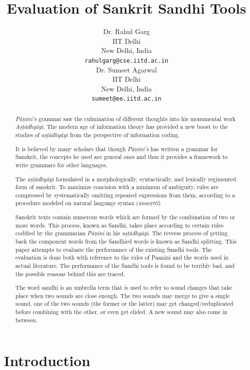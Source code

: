 \documentclass[11pt]{article}
\title{Evaluation of Sankrit Sandhi Tools}
\author{Dr. Rahul Garg \\
 IIT Delhi \\
  New Delhi, India \\
  {\tt rahulgarg@cse.iitd.ac.in} \\\And
  Dr. Sumeet Agarwal \\
  IIT Delhi \\
 New Delhi, India \\
  {\tt sumeet@ee.iitd.ac.in} \\}
\date{}
\begin{document}
\maketitle
\begin{abstract}
	
	\textit{P\={a}\d{n}ini's} grammar saw the culmination of different thoughts into his monumental work \textit{A\d{s}\d{t}\={a}dhy\={a}y\={\i}}. The modern age of information theory has provided a new boost to the studies of \textit{a\d{s}\d{t}\={a}dhy\={a}y\={\i}} from the perspective of information coding. 
	
	It is believed by many scholars that though \textit{P\={a}\d{n}ini's} has written a grammar for Sanskrit, the concepts he used are general ones and thus it provides a framework to write grammars for other languages.
	
	The \textit{a\d{s}\d{t}\={a}dhy\={a}y\={\i}} formulated in a morphologically, syntactically, and lexically regimented form of sanskrit. To maximize concision with a minimum of ambiguity, rules are compressed by systematically omitting repeated expressions from them, according to a procedure modeled on natural language syntax (\textit{anuv\d{r}tti})
	
	Sanskrit texts contain numerous words which are formed by the combination of two or more words. This process, known as Sandhi, takes place according to certain rules codified by the grammarian \textit{P\={a}\d{n}ini} in his \textit{a\d{s}\d{t}\={a}dhy\={a}y\={\i}}. The reverse process of getting back the component words from the Sandhied words is known as Sandhi splitting. This paper attempts to evaluate the performance of the existing Sandhi tools.  The evaluation is done both with reference to the rules of Paanini and the words used in actual literature. The performance of the Sandhi tools is found to be terribly bad, and the possible reasons behind this are traced.  
	
	The word sandhi is an umbrella term that is used to refer to sound changes that take place when two sounds are close enough. The two sounds may merge to give a single sound, one of the two sounds (the former or the latter) may get changed/reduplicated before combining with the other, or even get elided. A new sound may also come in between. 
\end{abstract}

\section{Introduction}
\end{document}
